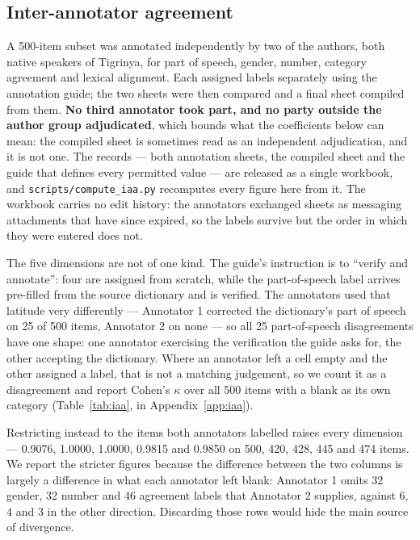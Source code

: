 \documentclass[11pt]{article}
\begin{document}
\subsection{Inter-annotator agreement}
\label{subsec:iaa}

A 500-item subset was annotated independently by two of the authors, both
native speakers of Tigrinya, for part of speech, gender, number, category
agreement and lexical alignment. Each assigned labels separately using the
annotation guide; the two sheets were then compared and a final sheet
compiled from them. \textbf{No third annotator took part, and no party
outside the author group adjudicated}, which bounds what the coefficients
below can mean: the compiled sheet is sometimes read as an independent
adjudication, and it is not one. The records --- both annotation sheets, the
compiled sheet and the guide that defines every permitted value --- are
released as a single workbook, and \texttt{scripts/compute\_iaa.py}
recomputes every figure here from it. The
workbook carries no edit history: the annotators exchanged sheets as
messaging attachments that have since expired, so the labels survive but the
order in which they were entered does not.

The five dimensions are not of one kind. The guide's instruction is to
``verify and annotate'': four are assigned from scratch, while the
part-of-speech label arrives pre-filled from the source dictionary and is
verified. The annotators used that latitude very differently --- Annotator 1
corrected the dictionary's part of speech on 25 of 500 items, Annotator 2 on
none --- so all 25 part-of-speech disagreements have one shape: one
annotator exercising the verification the guide asks for, the other
accepting the dictionary. Where an annotator left a cell empty and the other
assigned a label, that is not a matching judgement, so we count it as a
disagreement and report Cohen's $\kappa$ over all 500 items with a blank as
its own category (Table~\ref{tab:iaa}, in Appendix~\ref{app:iaa}).

Restricting instead to the items both annotators labelled raises every
dimension --- 0.9076, 1.0000, 1.0000, 0.9815 and 0.9850 on 500, 420, 428, 445
and 474 items. We report the stricter figures because the difference between the
two columns is largely a difference in what each annotator left blank:
Annotator 1 omits 32 gender, 32 number and 46 agreement labels that Annotator
2 supplies, against 6, 4 and 3 in the other direction. Discarding those rows
would hide the main source of divergence.
\end{document}
